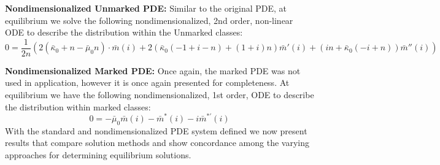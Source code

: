 \documentclass[review]{elsarticle}
\begin{document}
\textbf{Nondimensionalized Unmarked PDE:}
Similar to the original PDE, at equilibrium we solve the following nondimensionalized, 2nd order,
non-linear ODE to describe the distribution within the Unmarked classes:
\begin{equation*}
0=\frac{1}{2n} (2(\bar{\kappa}_0+n -\bar{\mu}_0 n)\cdot \bar{m}(i)+2(\bar{\kappa}_0(-1+i-n)+(1+i)n)\bar{m}'(i)+(in+\bar{\kappa}_0 (-i+n))\bar{m}''(i))
\end{equation*}

\textbf{Nondimensionalized Marked PDE:}
Once again, the marked PDE was not used in application, however it is once again presented for completeness.
At equilibrium we have the following nondimensionalized, 1st order, ODE to describe the distribution within marked classes:
\begin{equation*}
0=-\bar{\mu}_0 \bar{m}(i)-\bar{m}^{*}(i)-i\bar{m}^{*\prime}(i)
\end{equation*}
With the standard and nondimensionalized PDE system defined we now present results that compare solution methods and show concordance among the varying approaches for determining equilibrium solutions.
\end{document}
